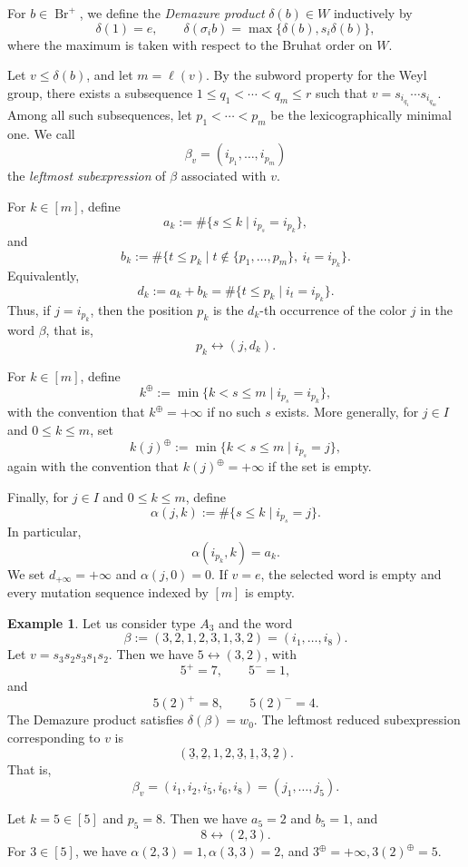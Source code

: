 \documentclass[12pt, reqno]{amsart}
\theoremstyle{plain}
\theoremstyle{definition}
\newtheorem{example}[theorem]{Example}
\numberwithin{equation}{section}
\newcommand{\Br}{{\operatorname{Br}}}
\begin{document}
For \(b\in \Br^+\), we define the \emph{Demazure product}
\(\delta(b)\in W\) inductively by
\[
\delta(1)=e,\qquad
\delta(\sigma_i b)=\max\{\delta(b),s_i\delta(b)\},
\]
where the maximum is taken with respect to the Bruhat order on \(W\).

Let \(v\le \delta(b)\), and let \(m=\ell(v)\). By the subword property for the
Weyl group, there exists a subsequence
\(
1\le q_1<\cdots<q_m\le r
\)
such that
\(
v=s_{i_{q_1}}\cdots s_{i_{q_m}}.
\)
Among all such subsequences, let
\(
p_1<\cdots<p_m
\)
be the lexicographically minimal one. We call
\[
\beta_v=(i_{p_1},\dots,i_{p_m})
\]
the \emph{leftmost subexpression} of \(\beta\) associated with \(v\).

For \(k\in[m]\), define
\[
a_k:=\#\{s\le k\mid i_{p_s}=i_{p_k}\},
\]
and
\[
b_k:=\#\{t\le p_k\mid t\notin\{p_1,\dots,p_m\},\ i_t=i_{p_k}\}.
\]
Equivalently,
\[
d_k:=a_k+b_k
     =\#\{t\le p_k\mid i_t=i_{p_k}\}.
\]
Thus, if \(j=i_{p_k}\), then the position \(p_k\) is the \(d_k\)-th occurrence
of the color \(j\) in the word \(\beta\), that is,
\[
p_k\leftrightarrow (j,d_k).
\]

For \(k\in[m]\), define
\[
k^{\oplus}:=\min\{k<s\leq m \mid i_{p_s}=i_{p_k}\},
\]
with the convention that \(k^{\oplus}=+\infty\) if no such \(s\) exists.
More generally, for \(j\in I\) and \(0\le k\le m\), set
\[
k(j)^{\oplus}:=\min\{k<s\leq m\mid i_{p_s}=j\},
\]
again with the convention that \(k(j)^{\oplus}=+\infty\) if the set is empty.

Finally, for \(j\in I\) and \(0\le k\le m\), define
\[
\alpha(j,k):=\#\{s\le k\mid i_{p_s}=j\}.
\]
In particular,
\[
\alpha(i_{p_k},k)=a_k.
\]
We set $d_{+\infty}=+\infty$ and $\alpha(j,0)=0$. If $v=e$, the
selected word is empty and every mutation sequence indexed by $[m]$ is empty.
\begin{example}\label{exm:words}
Let us consider type $A_3$ and the word
\[
\beta := (3,2,1,2,3,1,3,2) = (i_1,\ldots,i_8).
\]
Let
\(
v = s_3 s_2 s_3 s_1 s_2.
\)
Then we have $5 \leftrightarrow (3,2)$, with
\[
5^{+}=7,\qquad 5^{-}=1,
\]
and
\[
5(2)^{+}=8,\qquad 5(2)^{-}=4.
\]
The Demazure product satisfies $\delta(\beta)=w_0$.
The leftmost reduced subexpression corresponding to $v$ is
\[
(\underline{3},\underline{2},1,2,\underline{3},\underline{1},3,\underline{2}).
\]
That is,
\[
\beta_v=(i_1,i_2,i_5,i_6,i_8)=(j_1,\ldots,j_5).
\]

Let $k=5\in[5]$ and $p_5=8$. Then we have $a_5=2$ and $b_5=1$, and
\[
8\leftrightarrow(2,3).
\]
For $3\in [5]$, we have $\alpha(2,3)=1, \alpha(3,3)=2$, and $3^{\oplus}=+\infty, 3(2)^{\oplus}=5$. 
\end{example}
\end{document}

